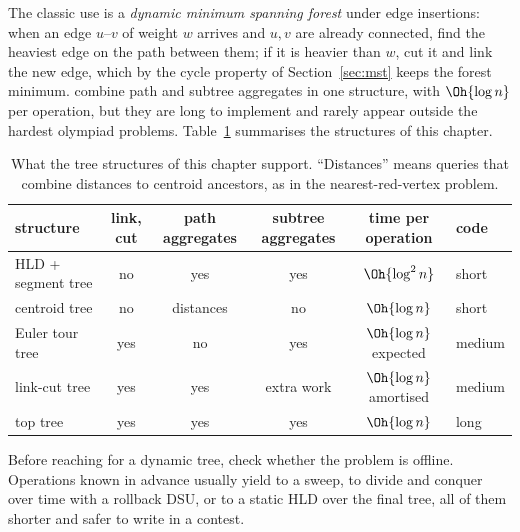 The classic use is a \emph{dynamic minimum spanning forest} under edge insertions: when an edge $u$--$v$ of weight $w$ arrives and
$u, v$ are already connected, find the heaviest edge on the path between them; if it is heavier than $w$, cut it and link the new
edge, which by the cycle property of Section~\ref{sec:mst} keeps the forest minimum.  combine path and subtree
aggregates in one structure, with $\Oh{\log n}$ per operation, but they are long to implement and rarely appear outside the
hardest olympiad problems. Table~\ref{tab:dyntrees} summarises the structures of this chapter.

\begin{table}[htbp]
\centering\small
\begin{tabular}{@{}lccccl@{}}
\toprule
structure & link, cut & path aggregates & subtree aggregates & time per operation & code \\
\midrule
HLD + segment tree & no & yes & yes & $\Oh{\log^2 n}$ & short \\
centroid tree & no & distances & no & $\Oh{\log n}$ & short \\
Euler tour tree & yes & no & yes & $\Oh{\log n}$ expected & medium \\
link-cut tree & yes & yes & extra work & $\Oh{\log n}$ amortised & medium \\
top tree & yes & yes & yes & $\Oh{\log n}$ & long \\
\bottomrule
\end{tabular}
\caption{What the tree structures of this chapter support. ``Distances'' means queries that combine distances to centroid
ancestors, as in the nearest-red-vertex problem.}
\label{tab:dyntrees}
\end{table}

\begin{tip}
Before reaching for a dynamic tree, check whether the problem is offline. Operations known in advance usually yield to a sweep, to
divide and conquer over time with a rollback DSU, or to a static HLD over the final tree, all of them shorter and safer to write
in a contest.
\end{tip}

